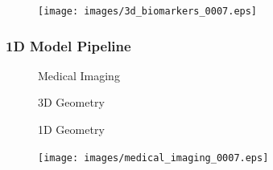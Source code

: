 \documentclass{beamer}
\begin{document}
\begin{frame}
\begin{figure}[htbp]
\begin{minipage}[c][0.35\paperheight][c]{\linewidth}
\begin{minipage}{0.1\linewidth}
			\end{minipage}
			\begin{minipage}{0.19\linewidth}
				\texttt{[image: images/3d\_biomarkers\_0007.eps]}
			\end{minipage}
			\begin{minipage}{0.1\linewidth}
				\caption*{\tiny}
			\end{minipage}
		\end{minipage}
	\end{figure}
\end{frame}

\begin{frame}
	\frametitle{1D Model Pipeline}
	\vspace{-16pt}
	\begin{figure}[htbp]
		\begin{minipage}[t][0.06\paperheight][t]{\linewidth}
			\begin{minipage}{0.19\linewidth}
				\caption*{\tiny Medical Imaging}
			\end{minipage}
			\begin{minipage}{0.1\linewidth}
				\caption*{\tiny}
			\end{minipage}
			\begin{minipage}{0.19\linewidth}
				\caption*{\tiny 3D Geometry}
			\end{minipage}
			\begin{minipage}{0.1\linewidth}
				\caption*{\tiny}
			\end{minipage}
			\begin{minipage}{0.19\linewidth}
				\caption*{\tiny 1D Geometry}
			\end{minipage}
			\begin{minipage}{0.1\linewidth}
				\caption*{\tiny}
			\end{minipage}
		\end{minipage}
		\begin{minipage}[c][0.35\paperheight][c]{\linewidth}
			\begin{minipage}{0.19\linewidth}
				\texttt{[image: images/medical\_imaging\_0007.eps]}
			\end{minipage}
			\begin{minipage}{0.1\linewidth}

\end{minipage}
\end{minipage}
\end{figure}
\end{frame}
\end{document}
